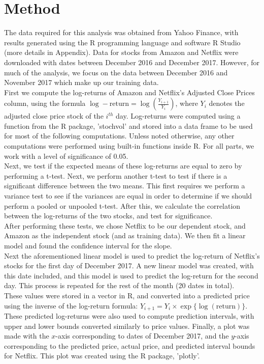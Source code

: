 \documentclass[12pt]{article}
\begin{document}
\section*{Method}
The data required for this analysis was obtained from Yahoo Finance, with results generated using the R programming language and software R Studio (more details in Appendix). Data for stocks from Amazon and Netflix were downloaded with dates between December 2016 and December 2017. However, for much of the analysis, we focus on the data between December 2016 and November 2017 which make up our training data.
\\First we compute the log-returns of Amazon and Netflix's Adjusted Close Prices column, using the formula $\log-\text{return} = \log(\frac{Y_{i+1}}{Y_i})$, where $Y_i$ denotes the adjusted close price stock of the $i^{th}$ day. Log-returns were computed using a function from the R package, 'stochvol' and stored into a data frame to be used for most of the following computations. Unless noted otherwise, any other computations were performed using built-in functions inside R. For all parts, we work with a level of significance of 0.05.
\\Next, we test if the expected means of these log-returns are equal to zero by performing a t-test. Next, we perform another t-test to test if there is a significant difference between the two means. This first requires we perform a variance test to see if the variances are equal in order to determine if we should perform a pooled or unpooled t-test. After this, we calculate the correlation between the log-returns of the two stocks, and test for significance. 
\\After performing these tests, we chose Netflix to be our dependent stock, and Amazon as the independent stock (and as training data). We then fit a linear model and found the confidence interval for the slope.  
\\Next the aforementioned linear model is used to predict the log-return of Netflix's stocks for the first day of December 2017. A new linear model was created, with this date included, and this model is used to predict the log-return for the second day. This process is repeated for the rest of the month (20 dates in total). 
\\These values were stored in a vector in R, and converted into a predicted price using the inverse of the log-return formula: $Y_{i+1} = Y_i\times\exp\{\log(\text{return})\}$. These predicted log-returns were also used to compute prediction intervals, with upper and lower bounds converted similarly to price values. Finally, a plot was made with the $x$-axis corresponding to dates of December 2017, and the $y$-axis corresponding to the predicted price, actual price, and predicted interval bounds for Netflix. This plot was created using the R package, 'plotly'.
\end{document}
